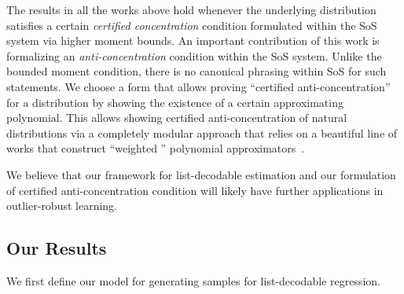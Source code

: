 \documentclass{article}
\theoremstyle{definition}
\theoremstyle{remark}
\numberwithin{equation}{section}
\newcommand{\1}{\bm{1}}
\begin{document}
The results in all the works above hold whenever the underlying distribution satisfies a certain \emph{certified concentration} condition formulated within the SoS system via higher moment bounds. An important contribution of this work is formalizing an \emph{anti-concentration} condition within the SoS system. Unlike the bounded moment condition, there is no canonical phrasing  within SoS for such statements. We choose a form that allows proving ``certified anti-concentration'' for a distribution by showing the existence of a certain approximating polynomial. This allows showing certified anti-concentration of natural distributions via a completely modular approach that relies on a beautiful line of works that construct ``weighted '' polynomial approximators~\cite{2007math......1099L}. 

We believe that our framework for list-decodable estimation and our formulation of certified anti-concentration condition will likely have further applications in outlier-robust learning. 
\subsection{Our Results}
We first define our model for generating samples for list-decodable regression.
\end{document}

